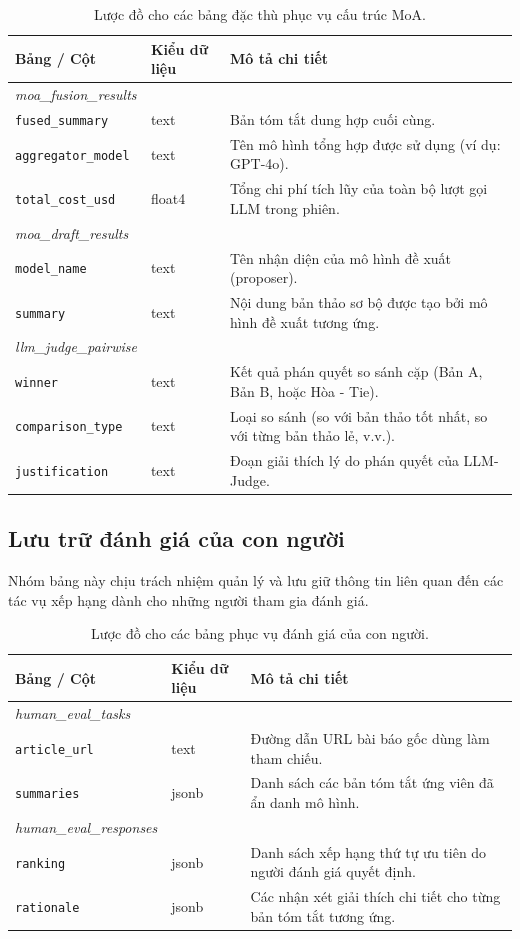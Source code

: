 \begin{table}[H]
\centering
\caption{Lược đồ cho các bảng đặc thù phục vụ cấu trúc MoA.}
\begin{tabularx}{\linewidth}{llX}
\hline
\textbf{Bảng / Cột} & \textbf{Kiểu dữ liệu} & \textbf{Mô tả chi tiết} \\ \hline
\textit{moa\_fusion\_results} & & \\
\texttt{fused\_summary} & text & Bản tóm tắt dung hợp cuối cùng. \\
\texttt{aggregator\_model} & text & Tên mô hình tổng hợp được sử dụng (ví dụ: GPT-4o). \\
\texttt{total\_cost\_usd} & float4 & Tổng chi phí tích lũy của toàn bộ lượt gọi LLM trong phiên. \\ \hline
\textit{moa\_draft\_results} & & \\
\texttt{model\_name} & text & Tên nhận diện của mô hình đề xuất (proposer). \\
\texttt{summary} & text & Nội dung bản thảo sơ bộ được tạo bởi mô hình đề xuất tương ứng. \\ \hline
\textit{llm\_judge\_pairwise} & & \\
\texttt{winner} & text & Kết quả phán quyết so sánh cặp (Bản A, Bản B, hoặc Hòa - Tie). \\
\texttt{comparison\_type} & text & Loại so sánh (so với bản thảo tốt nhất, so với từng bản thảo lẻ, v.v.). \\
\texttt{justification} & text & Đoạn giải thích lý do phán quyết của LLM-Judge. \\ \hline
\end{tabularx}
\end{table}

\subsection{Lưu trữ đánh giá của con người}

Nhóm bảng này chịu trách nhiệm quản lý và lưu giữ thông tin liên quan đến các tác vụ xếp hạng dành cho những người tham gia đánh giá.

\begin{table}[H]
\centering
\caption{Lược đồ cho các bảng phục vụ đánh giá của con người.}
\begin{tabularx}{\linewidth}{llX}
\hline
\textbf{Bảng / Cột} & \textbf{Kiểu dữ liệu} & \textbf{Mô tả chi tiết} \\ \hline
\textit{human\_eval\_tasks} & & \\
\texttt{article\_url} & text & Đường dẫn URL bài báo gốc dùng làm tham chiếu. \\
\texttt{summaries} & jsonb & Danh sách các bản tóm tắt ứng viên đã ẩn danh mô hình. \\ \hline
\textit{human\_eval\_responses} & & \\
\texttt{ranking} & jsonb & Danh sách xếp hạng thứ tự ưu tiên do người đánh giá quyết định. \\
\texttt{rationale} & jsonb & Các nhận xét giải thích chi tiết cho từng bản tóm tắt tương ứng. \\ \hline
\end{tabularx}
\end{table}


